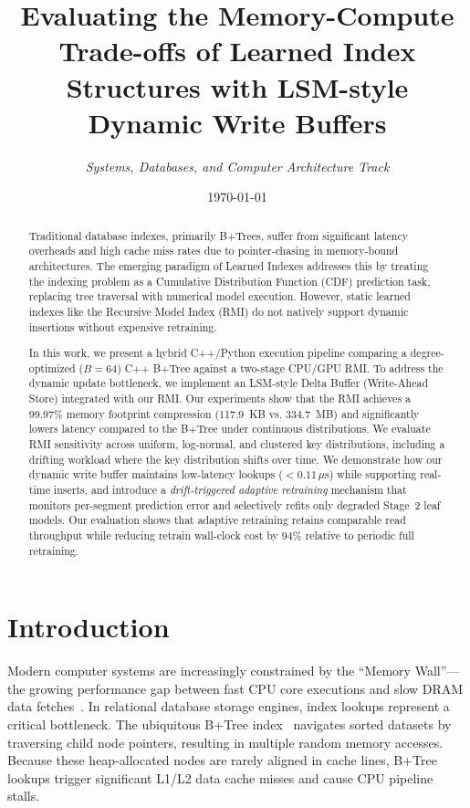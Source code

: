 \documentclass[10pt,twocolumn,a4paper]{article}
\title{\textbf{Evaluating the Memory-Compute Trade-offs of Learned Index Structures with LSM-style Dynamic Write Buffers}}
\author{
    \textit{Systems, Databases, and Computer Architecture Track}
}
\date{\today}
\begin{document}
\maketitle

\begin{abstract}
Traditional database indexes, primarily B+Trees, suffer from significant latency overheads and high cache miss rates due to pointer-chasing in memory-bound architectures. The emerging paradigm of Learned Indexes addresses this by treating the indexing problem as a Cumulative Distribution Function (CDF) prediction task, replacing tree traversal with numerical model execution. However, static learned indexes like the Recursive Model Index (RMI) do not natively support dynamic insertions without expensive retraining. 

In this work, we present a hybrid C++/Python execution pipeline comparing a degree-optimized ($B=64$) C++ B+Tree against a two-stage CPU/GPU RMI. To address the dynamic update bottleneck, we implement an LSM-style Delta Buffer (Write-Ahead Store) integrated with our RMI. Our experiments show that the RMI achieves a 99.97\% memory footprint compression (117.9~KB vs. 334.7~MB) and significantly lowers latency compared to the B+Tree under continuous distributions. We evaluate RMI sensitivity across uniform, log-normal, and clustered key distributions, including a drifting workload where the key distribution shifts over time. We demonstrate how our dynamic write buffer maintains low-latency lookups ($<0.11\,\mu$s) while supporting real-time inserts, and introduce a \textit{drift-triggered adaptive retraining} mechanism that monitors per-segment prediction error and selectively refits only degraded Stage~2 leaf models. Our evaluation shows that adaptive retraining retains comparable read throughput while reducing retrain wall-clock cost by $94\%$ relative to periodic full retraining.
\end{abstract}

\section{Introduction}
Modern computer systems are increasingly constrained by the ``Memory Wall''---the growing performance gap between fast CPU core executions and slow DRAM data fetches~\cite{wulf1995hitting, hennessy2011computer}. In relational database storage engines, index lookups represent a critical bottleneck. The ubiquitous B+Tree index~\cite{comer1979ubiquitous} navigates sorted datasets by traversing child node pointers, resulting in multiple random memory accesses. Because these heap-allocated nodes are rarely aligned in cache lines, B+Tree lookups trigger significant L1/L2 data cache misses and cause CPU pipeline stalls.
\end{document}
